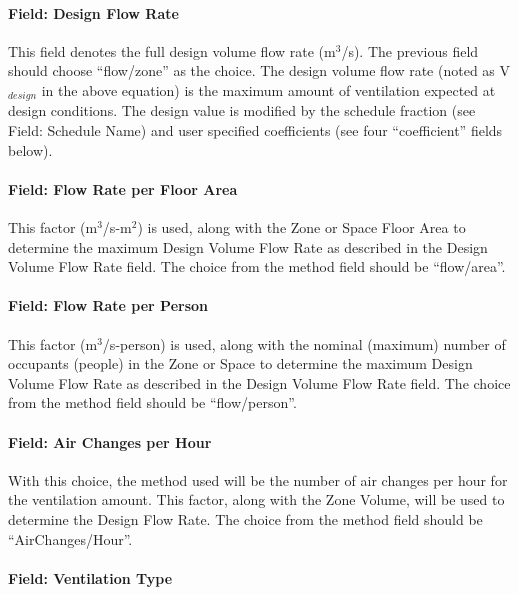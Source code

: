 \paragraph{Field: Design Flow Rate}\label{field-design-flow-rate-1}

This field denotes the full design volume flow rate (m\(^{3}\)/s). The previous field should choose ``flow/zone'' as the choice. The design volume flow rate (noted as V\(_{design}\) in the above equation) is the maximum amount of ventilation expected at design conditions. The design value is modified by the schedule fraction (see Field: Schedule Name) and user specified coefficients (see four ``coefficient'' fields below).

\paragraph{Field: Flow Rate per Floor Area}\label{field-flow-rate-per-zone-floor-area}

This factor (m\(^{3}\)/s-m\(^{2}\)) is used, along with the Zone or Space Floor Area to determine the maximum Design Volume Flow Rate as described in the Design Volume Flow Rate field. The choice from the method field should be ``flow/area''.

\paragraph{Field: Flow Rate per Person}\label{field-flow-rate-per-person}

This factor (m\(^{3}\)/s-person) is used, along with the nominal (maximum) number of occupants (people) in the Zone or Space to determine the maximum Design Volume Flow Rate as described in the Design Volume Flow Rate field. The choice from the method field should be ``flow/person''.

\paragraph{Field: Air Changes per Hour}\label{field-air-changes-per-hour-1}

With this choice, the method used will be the number of air changes per hour for the ventilation amount. This factor, along with the Zone Volume, will be used to determine the Design Flow Rate. The choice from the method field should be ``AirChanges/Hour''.

\paragraph{Field: Ventilation Type}\label{field-ventilation-type}

